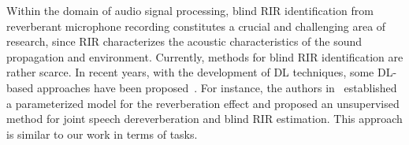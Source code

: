 Within the domain of audio signal processing, blind RIR identification from reverberant microphone recording constitutes a crucial and challenging area of research, since RIR characterizes the acoustic characteristics of the sound propagation and environment.
Currently, 
methods for blind RIR identification are rather scarce. 
In recent years, with the development of DL techniques, some DL-based approaches have been proposed~\cite{steinmetz2021filtered,richard2022deep,lemercier2024unsupervised}.
For instance, the authors in~\cite{lemercier2024unsupervised} established a parameterized model for the reverberation effect and proposed an unsupervised method for joint speech dereverberation and blind RIR estimation. 
This approach is similar to our work in terms of tasks.


